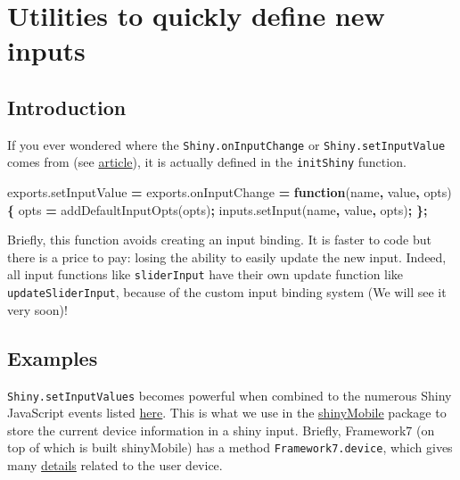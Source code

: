 \documentclass[
]{book}
\newenvironment{Shaded}{\begin{snugshade}}{\end{snugshade}}
\newcommand{\AttributeTok}[1]{\textcolor[rgb]{0.77,0.63,0.00}{#1}}
\newcommand{\KeywordTok}[1]{\textcolor[rgb]{0.13,0.29,0.53}{\textbf{#1}}}
\newcommand{\NormalTok}[1]{#1}
\newcommand{\OperatorTok}[1]{\textcolor[rgb]{0.81,0.36,0.00}{\textbf{#1}}}
\newcommand{\VariableTok}[1]{\textcolor[rgb]{0.00,0.00,0.00}{#1}}
\begin{document}
\hypertarget{utilities-to-quickly-define-new-inputs}{%
\section{Utilities to quickly define new inputs}\label{utilities-to-quickly-define-new-inputs}}

\hypertarget{introduction-2}{%
\subsection{Introduction}\label{introduction-2}}

If you ever wondered where the \texttt{Shiny.onInputChange} or \texttt{Shiny.setInputValue} comes from (see \href{https://shiny.rstudio.com/articles/communicating-with-js.html}{article}), it is actually defined in the \texttt{initShiny} function.

\begin{Shaded}
\begin{Highlighting}[]
\VariableTok{exports}\NormalTok{.}\AttributeTok{setInputValue} \OperatorTok{=} \VariableTok{exports}\NormalTok{.}\AttributeTok{onInputChange} \OperatorTok{=} \KeywordTok{function}\NormalTok{(name}\OperatorTok{,}\NormalTok{ value}\OperatorTok{,}\NormalTok{ opts) }\OperatorTok{\{}
\NormalTok{  opts }\OperatorTok{=} \AttributeTok{addDefaultInputOpts}\NormalTok{(opts)}\OperatorTok{;}
  \VariableTok{inputs}\NormalTok{.}\AttributeTok{setInput}\NormalTok{(name}\OperatorTok{,}\NormalTok{ value}\OperatorTok{,}\NormalTok{ opts)}\OperatorTok{;}
\OperatorTok{\};}
\end{Highlighting}
\end{Shaded}

Briefly, this function avoids creating an input binding. It is faster to code but there is a price to pay: losing the ability to easily update the new input. Indeed, all input functions like \texttt{sliderInput} have their own update function like \texttt{updateSliderInput}, because of the custom input binding system (We will see it very soon)!

\hypertarget{examples}{%
\subsection{Examples}\label{examples}}

\texttt{Shiny.setInputValues} becomes powerful when combined to the numerous Shiny JavaScript events listed \href{https://shiny.rstudio.com/articles/js-events.html}{here}. This is what
we use in the \href{https://rinterface.github.io/shinyMobile/articles/shinyMobile_tools.html}{shinyMobile} package to store the current device information in a shiny input.
Briefly, Framework7 (on top of which is built shinyMobile) has a method \texttt{Framework7.device}, which gives many \href{https://framework7.io/docs/device.html}{details} related to the user device.
\end{document}

